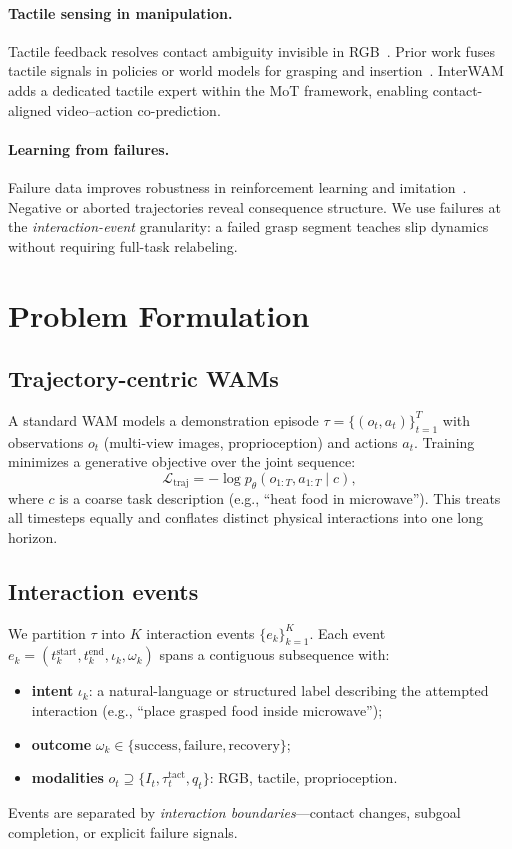 \documentclass{article}
\begin{document}
\paragraph{Tactile sensing in manipulation.}
Tactile feedback resolves contact ambiguity invisible in RGB~\citep{lee2019touch,yang2024tactile}.
Prior work fuses tactile signals in policies or world models for grasping and insertion~\citep{li2022visualtouch}.
InterWAM adds a dedicated tactile expert within the MoT framework, enabling contact-aligned video--action co-prediction.

\paragraph{Learning from failures.}
Failure data improves robustness in reinforcement learning and imitation~\citep{sinapov2014learning,bodnar2024fail}.
Negative or aborted trajectories reveal consequence structure.
We use failures at the \emph{interaction-event} granularity: a failed grasp segment teaches slip dynamics without requiring full-task relabeling.

\section{Problem Formulation}
\label{sec:problem}

\subsection{Trajectory-centric WAMs}
A standard WAM models a demonstration episode $\tau = \{(o_t, a_t)\}_{t=1}^{T}$ with observations $o_t$ (multi-view images, proprioception) and actions $a_t$.
Training minimizes a generative objective over the joint sequence:
\begin{equation}
    \mathcal{L}_{\text{traj}} = -\log p_\theta(o_{1:T}, a_{1:T} \mid c),
\end{equation}
where $c$ is a coarse task description (e.g., ``heat food in microwave'').
This treats all timesteps equally and conflates distinct physical interactions into one long horizon.

\subsection{Interaction events}
We partition $\tau$ into $K$ interaction events $\{e_k\}_{k=1}^{K}$.
Each event $e_k = (t_k^{\text{start}}, t_k^{\text{end}}, \iota_k, \omega_k)$ spans a contiguous subsequence with:
\begin{itemize}
    \item \textbf{intent} $\iota_k$: a natural-language or structured label describing the attempted interaction (e.g., ``place grasped food inside microwave'');
    \item \textbf{outcome} $\omega_k \in \{\text{success}, \text{failure}, \text{recovery}\}$;
    \item \textbf{modalities} $o_t \supseteq \{I_t, \tau^{\text{tact}}_t, q_t\}$: RGB, tactile, proprioception.
\end{itemize}
Events are separated by \emph{interaction boundaries}---contact changes, subgoal completion, or explicit failure signals.
\end{document}
